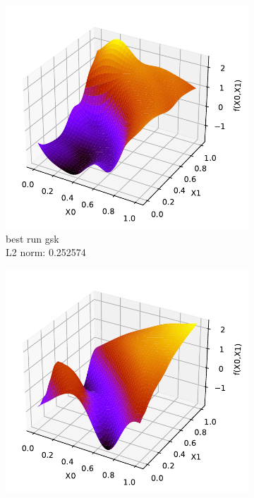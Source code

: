 \documentclass[./\jobname.tex]{subfiles}
\begin{document}
\begin{figure}[h]
	\centering
	\begin{subfigure}[b]{0.3333\linewidth}
		\centering
		\includegraphics[width=1\textwidth]{../../code/experiments/experiment_3/pde5_best_solution_non-adaptive.pdf}
		\caption{best run  \gls{gsk} \\L2 norm: 0.252574}
		\label{fig:pde5_ex3_worst_solution_non-adaptive}
	\end{subfigure}%
	\begin{subfigure}[b]{0.3333\linewidth}
		\centering
		\includegraphics[width=1\textwidth]{../../code/experiments/experiment_3/pde5_worst_solution_non-adaptive.pdf}

\end{subfigure}
\end{figure}
\end{document}
